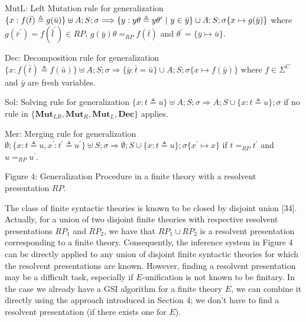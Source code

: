 \par
 
MutL: Left Mutation rule for generalization  $\{x:f(\bar{t})\triangleq g(\bar{u})\}\uplus A;S;\sigma\Longrightarrow\{y:y\theta\triangleq y\theta^{\prime}\leavevmode\nobreak\ |\leavevmode\nobreak\ y\in\bar{y}\}\cup A;S;\sigma\{x\mapsto g(\bar{y})\}$ where $g(\bar{r}^{\prime})=f(\bar{l}^{\prime})\in RP$, $g(\bar{y})\theta=_{RP}f(\bar{t})$ and $\theta^{\prime}=\{\bar{y}\mapsto\bar{u}\}$.\par
      
\par
 
Dec: Decomposition rule for generalization  $\{x:f(\bar{t})\triangleq f(\bar{u})\}\uplus A;S;\sigma\Longrightarrow\{\bar{y}:\bar{t}=\bar{u}\}\cup A;S;\sigma\{x\mapsto f(\bar{y})\}$ where $f\in{\Sigma}^{C}$ and $\bar{y}$ are fresh variables.\par
     
\par
 
Sol: Solving rule for generalization  $\{x:t\triangleq u\}\uplus A;S;\sigma\Longrightarrow A;S\cup\{x:t\triangleq u\};\sigma$ if no rule in $\{\mathbf{Mut}_{LR},\mathbf{Mut}_{R},\mathbf{Mut}_{L},\mathbf{Dec}\}$ applies.\par
      
\par
 
Mer: Merging rule for generalization  $\emptyset;\{x:t\triangleq u,x^{\prime}:t^{\prime}\triangleq u^{\prime}\}\uplus
S;\sigma\Longrightarrow\emptyset;S\cup\{x:t\triangleq u\};\sigma\{x^{\prime}\mapsto x\}$ if $t=_{RP}t^{\prime}$ and $u=_{RP}u^{\prime}$.\par
    
Figure 4: Generalization Procedure in a finite theory with a resolvent presentation $RP$.\par
 
 
 
The class of finite syntactic theories is known to be closed by disjoint union [34]. Actually, for a union of two disjoint finite theories with respective resolvent presentations $RP_{1}$ and $RP_{2}$, we have that $RP_{1}\cup RP_{2}$ is a resolvent presentation corresponding to a finite theory. Consequently, the inference system in Figure 4 can be directly applied to any union of disjoint finite syntactic theories for which the resolvent presentations are known. However, finding a resolvent presentation may be a difficult task, especially if $E$-unification is not known to be finitary. In the case we already have a GSI algorithm for a finite theory $E$, we can combine it directly using the approach introduced in Section 4; we don’t have to find a resolvent presentation (if there exists one for $E$).\par
 
